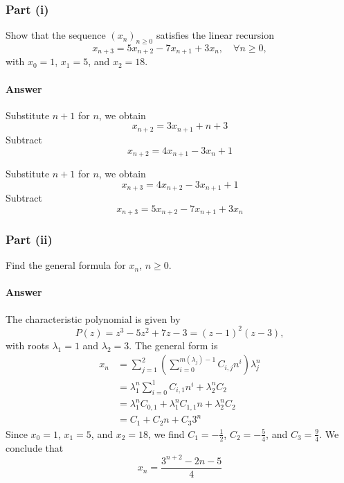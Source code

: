 \subsubsection{Part (i)}
Show that the sequence $ (x_n)_{n \geq 0} $ satisfies the linear recursion
\begin{equation*}
    x_{n + 3} = 5 x_{n + 2} - 7 x_{n + 1} + 3 x_n, \quad \forall n \geq 0,
\end{equation*}
with $ x_0 = 1 $, $ x_1 = 5 $, and $ x_2 = 18 $.

\paragraph{Answer}
Substitute $ n + 1 $ for $ n $, we obtain
\begin{equation*}
    x_{n + 2} = 3 x_{n + 1} + n + 3
\end{equation*}
Subtract
\begin{equation*}
    x_{n + 2} = 4 x_{n + 1} - 3 x_n + 1
\end{equation*}

Substitute $ n + 1 $ for $ n $, we obtain
\begin{equation*}
    x_{n + 3} = 4 x_{n + 2} - 3 x_{n + 1} + 1
\end{equation*}
Subtract
\begin{equation*}
    x_{n + 3} = 5 x_{n + 2} - 7 x_{n + 1} + 3 x_n
\end{equation*}

\subsubsection{Part (ii)}
Find the general formula for $ x_n $, $ n \geq 0 $.

\paragraph{Answer}
The characteristic polynomial is given by
\begin{equation*}
    P(z) = z^3 - 5 z^2 + 7 z - 3 = (z - 1)^2(z - 3),
\end{equation*}
with roots $ \lambda_1 = 1 $ and $ \lambda_2 = 3$.
The general form is
\begin{align*}
    x_n &= \sum_{j=1}^{2} \left( \sum_{i=0}^{m(\lambda_j)-1} C_{i,j} n^i \right) \lambda_j^n \\
        &= \lambda_1^n \sum_{i=0}^{1} C_{i,1} n^i + \lambda_2^n C_2 \\
        &= \lambda_1^n C_{0, 1} + \lambda_1^n C_{1, 1} n + \lambda_2^n C_2 \\
        &= C_1 + C_2 n + C_3 3^n
\end{align*}
Since $ x_0 = 1 $, $ x_1 = 5 $, and $ x_2 = 18 $, we find $ C_1 = -\frac{1}{2} $, $ C_2 = -\frac{5}{4} $, and $ C_3 = \frac{9}{4} $.
We conclude that
\begin{equation*}
    x_n = \frac{3^{n + 2} - 2n - 5}{4}
\end{equation*}

